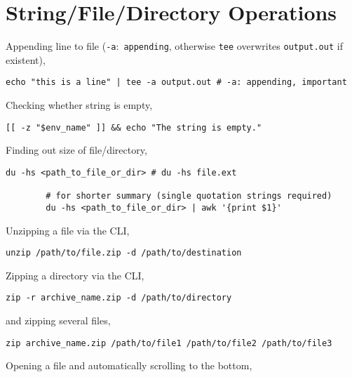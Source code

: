 \documentclass[12pt, a4paper]{scrbook}
\numberwithin{equation}{section}
\theoremstyle{definition}
\theoremstyle{definition}
\begin{document}
	\section{String/File/Directory Operations}
	
	Appending line to file (\texttt{-a}:~\texttt{appending}, otherwise \texttt{tee} overwrites \texttt{output.out} if existent),
	
	\begin{lstlisting}[style=mystylebash, label=alg:ubuntu__line_appending, xleftmargin=\parindent]
		echo "this is a line" | tee -a output.out # -a: appending, important
	\end{lstlisting}
	
	Checking whether string is empty,
	
	\begin{lstlisting}[style=mystylebash, label=alg:bash__empty_string_check, xleftmargin=\parindent]
		[[ -z "$env_name" ]] && echo "The string is empty."
	\end{lstlisting}
	
	Finding out size of file/directory,
	
	\begin{lstlisting}[style=mystylebash, label=alg:dir_size, xleftmargin=\parindent]
		du -hs <path_to_file_or_dir> # du -hs file.ext
		
		# for shorter summary (single quotation strings required)
		du -hs <path_to_file_or_dir> | awk '{print $1}'
	\end{lstlisting}

	Unzipping a file via the CLI, 
	\begin{lstlisting}[style=mystylebash, label=alg:bash_unzip, xleftmargin=\parindent]
		unzip /path/to/file.zip -d /path/to/destination
	\end{lstlisting}

	Zipping a directory via the CLI,
	\begin{lstlisting}[style=mystylebash, label=alg:bash_zip, xleftmargin=\parindent]
		zip -r archive_name.zip -d /path/to/directory
	\end{lstlisting}

	and zipping several files,
	
	\begin{lstlisting}[style=mystylebash, label=alg:bash_zip__files, xleftmargin=\parindent]
		zip archive_name.zip /path/to/file1 /path/to/file2 /path/to/file3
 	\end{lstlisting}

	Opening a file and automatically scrolling to the bottom,
	
\end{document}
